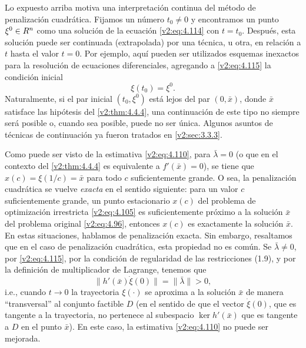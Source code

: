 Lo expuesto arriba motiva una interpretación continua del método de penalización cuadrática. Fijamos un número $t_0 \neq 0$ y encontramos un punto $\xi^0 \in R^n$ como una solución de la ecuación \eqref{v2:eq:4.114} con $t = t_0$. Después, esta solución puede ser continuada (extrapolada) por una técnica, u otra, en relación a $t$ hasta el valor $t = 0$. Por ejemplo, aquí pueden ser utilizados esquemas inexactos para la resolución de ecuaciones diferenciales, agregando a \eqref{v2:eq:4.115} la condición inicial
\[
    \xi(t_0) = \xi^0.
\]
Naturalmente, si el par inicial $(t_0, \xi^0)$ está lejos del par $(0, \bar{x})$, donde $\bar{x}$ satisface las hipótesis del \cref{v2:thm:4.4.4}, una continuación de este tipo no siempre será posible o, cuando sea posible, puede no ser única. Algunos asuntos de técnicas de continuación ya fueron tratados en \cref{v2:sec:3.3.3}.

Como puede ser visto de la estimativa \eqref{v2:eq:4.110}, para $\bar{\lambda} = 0$ (o que en el contexto del \cref{v2:thm:4.4.4} es equivalente a $f'(\bar{x}) = 0$), se tiene que $x(c) = \xi(1/c) = \bar{x}$ para todo $c$ suficientemente grande. O sea, la penalización cuadrática se vuelve \textit{exacta} en el sentido siguiente: para un valor $c$ suficientemente grande, un punto estacionario $x(c)$ del problema de optimización irrestricta \eqref{v2:eq:4.105} es suficientemente próximo a la solución $\bar{x}$ del problema original \eqref{v2:eq:4.96}, entonces $x(c)$ es exactamente la solución $\bar{x}$. En estas situaciones, hablamos de penalización exacta. Sin embargo, resaltamos que en el caso de penalización cuadrática, esta propiedad no es común.
Se $\bar{\lambda} \neq 0$, por \eqref{v2:eq:4.115}, por la condición de regularidad de las restricciones (1.9), y por la definición de multiplicador de Lagrange, tenemos que
\[
    \|h'(\bar{x})\dot{\xi}(0)\| = \|\bar{\lambda}\| > 0,
\]
i.e., cuando $t \to 0$ la trayectoria $\xi(\cdot)$ se aproxima a la solución $\bar{x}$ de manera ``transversal'' al conjunto factible $D$ (en el sentido de que el vector $\dot{\xi}(0)$, que es tangente a la trayectoria, no pertenece al subespacio $\ker h'(\bar{x})$ que es tangente a $D$ en el punto $\bar{x}$). En este caso, la estimativa \eqref{v2:eq:4.110} no puede ser mejorada.


